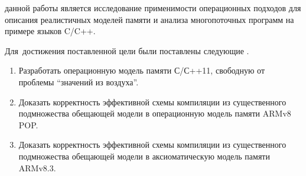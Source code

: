 



{\aim} данной работы является исследование применимости операционных
подходов для описания реалистичных моделей памяти и анализа
многопоточных программ на примере языков C/C++.

Для~достижения поставленной цели были поставлены следующие {\tasks}.
\begin{enumerate}
  \item Разработать операционную модель памяти С/С++11, свободную от проблемы ``значений из воздуха''.
  \item Доказать корректность эффективной схемы компиляции из существенного подмножества обещающей модели в операционную модель памяти ARMv8 POP.
  \item Доказать корректность эффективной схемы компиляции из существенного подмножества обещающей модели в аксиоматическую модель памяти ARMv8.3.
\end{enumerate}

